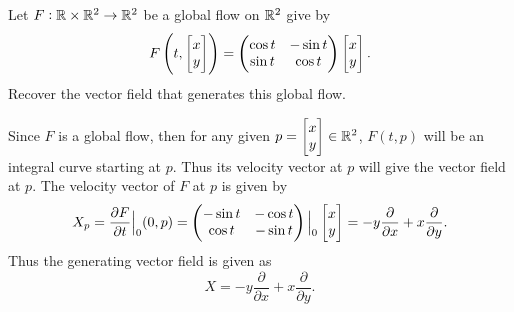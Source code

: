 \begin{problem}
	Let $ F: \mathbb{R}\times \mathbb{R}^2 \to \mathbb{R}^2 $ be a global flow on $ \mathbb{R}^2 $ give by
	\[ F\left( t, \begin{bmatrix} x \\ y \end{bmatrix} \right) = \begin{pmatrix} \cos t & -\sin t \\ \sin t & \cos t \end{pmatrix} \begin{bmatrix} x \\ y \end{bmatrix}. \]
	Recover the vector field that generates this global flow.
\end{problem}
\begin{solution}
	Since $ F $ is a global flow, then for any given $ p = \begin{bmatrix} x \\ y \end{bmatrix} \in \mathbb{R}^2 $, $ F(t,p) $ will be an integral curve starting at $ p $. Thus its velocity vector at $ p $ will give the vector field at $ p $. The velocity vector of $ F $ at $ p $ is given by
	\[ X_p = \frac{\partial F }{\partial t}\big|_{0}(0,p) = \begin{pmatrix} -\sin t & -\cos t \\ \cos t & -\sin t \end{pmatrix}\big|_{0} \begin{bmatrix} x \\ y \end{bmatrix} = -y\frac{\partial }{\partial x} + x \frac{\partial }{\partial y}. \]
	Thus the generating vector field is given as
	\[ X = -y \frac{\partial }{\partial x } + x \frac{\partial }{\partial y}. \]
\end{solution}